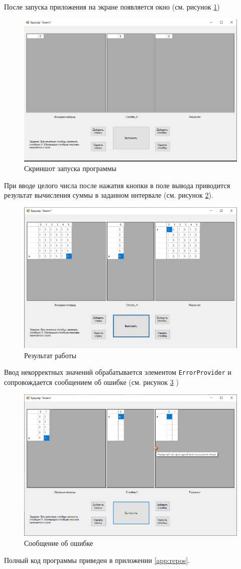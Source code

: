 После запуска приложения на экране появляется окно (см. рисунок \ref{fig:exec5})
\begin{figure}[H]
    \centering
    \includegraphics[scale=0.6]{task5/exec.png}
    \caption{Скриншот запуска программы}
    \label{fig:exec5}
\end{figure}
При вводе целого числа после нажатия кнопки в поле вывода приводится
результат вычисления суммы в заданном интервале (см. рисунок \ref{fig:result5}).
\begin{figure}[H]
    \centering
    \includegraphics[scale=0.6]{task5/result.png}
    \caption{Результат работы}
    \label{fig:result5}
\end{figure}
Ввод некорректных значений обрабатывается элементом \verb|ErrorProvider| и 
сопровождается сообщением об ошибке (см. рисунок \ref{fig:error5} )
\begin{figure}[H]
    \centering
    \includegraphics[scale=0.45]{task5/error.png}
    \caption{Сообщение об ошибке}
    \label{fig:error5}
\end{figure}
Полный код программы приведен в приложении \ref{app:repos}.